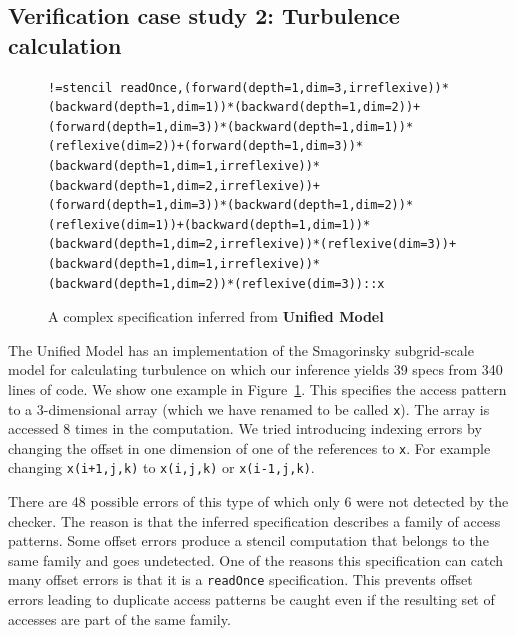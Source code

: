 \documentclass[9pt,preprint]{sigplanconf}
\theoremstyle{definition}
\begin{document}
\subsection{Verification case study 2: Turbulence calculation}

\begin{figure}[t]\begin{verbatim}
!=stencil readOnce,(forward(depth=1,dim=3,irreflexive))*(backward(depth=1,dim=1))*(backward(depth=1,dim=2))+(forward(depth=1,dim=3))*(backward(depth=1,dim=1))*(reflexive(dim=2))+(forward(depth=1,dim=3))*(backward(depth=1,dim=1,irreflexive))*(backward(depth=1,dim=2,irreflexive))+(forward(depth=1,dim=3))*(backward(depth=1,dim=2))*(reflexive(dim=1))+(backward(depth=1,dim=1))*(backward(depth=1,dim=2,irreflexive))*(reflexive(dim=3))+(backward(depth=1,dim=1,irreflexive))*(backward(depth=1,dim=2))*(reflexive(dim=3))::x
\end{verbatim}
\caption{A complex specification inferred from
  \textbf{Unified Model}\label{fig:smagorinsky}}
\vspace{-1em}
\end{figure}

\noindent
The Unified Model has an implementation of the Smagorinsky
subgrid-scale model for calculating turbulence on which our
inference yields 39 specs from 340 lines of code. We show
one example in Figure~\ref{fig:smagorinsky}. 
This specifies the access pattern to a 3-dimensional array (which we have renamed to be called \texttt{x}). The array is accessed 8 times in the computation. We tried introducing indexing errors by changing the offset in one dimension of one of the references to \texttt{x}. For example changing \texttt{x(i+1,j,k)} to \texttt{x(i,j,k)} or \texttt{x(i-1,j,k)}.

There are 48 possible errors of this type of which only 6 were not 
detected by the checker. The reason is that the inferred
specification describes a family of access patterns. Some offset errors
produce a stencil computation that belongs to the same family and goes
undetected.
One of the reasons this specification can catch many offset errors is that it is
a \texttt{readOnce} specification. This prevents offset errors leading to
duplicate access patterns be caught even if the resulting set of accesses are
part of the same family.
\end{document}
